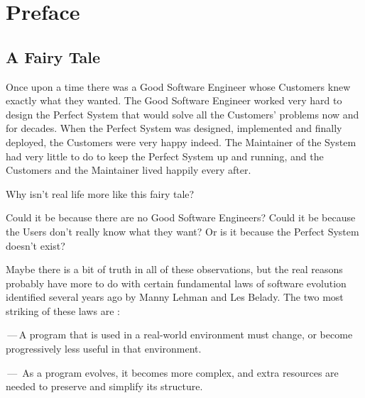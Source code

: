 \documentclass[a4paper,10pt,twoside]{book}
\begin{document}
	\frontmatter
	\sloppy
\fi

\chapter{Preface}

\section*{A Fairy Tale}

\begin{center}
\begin{Large}
Once upon a time there was a Good Software Engineer whose Customers knew exactly what they wanted. The Good Software Engineer worked very hard to design the Perfect System that would solve all the Customers' problems now and for decades. When the Perfect System was designed, implemented and finally deployed, the Customers were very happy indeed. The Maintainer of the System had very little to do to keep the Perfect System up and running, and the Customers and the Maintainer lived happily every after.
\end{Large}
\end{center}

\noindent
Why isn't real life more like this fairy tale?

Could it be because there are no Good Software Engineers? Could it be because the Users don't really know what they want? Or is it because the Perfect System doesn't exist? 

Maybe there is a bit of truth in all of these observations, but the real reasons probably have more to do with certain fundamental laws of software evolution identified several years ago by  Manny Lehman and  Les Belady. The two most striking of these laws are \cite{Lehm85a}:
\begin{bulletlist}
  \item {}\,---\,A program that is used in a real-world environment must change, or become progressively less useful in that environment.
  \item {}\,---\,
As a program evolves, it becomes more complex, and extra resources are needed to preserve and simplify its structure.
\end{bulletlist}
\end{document}
